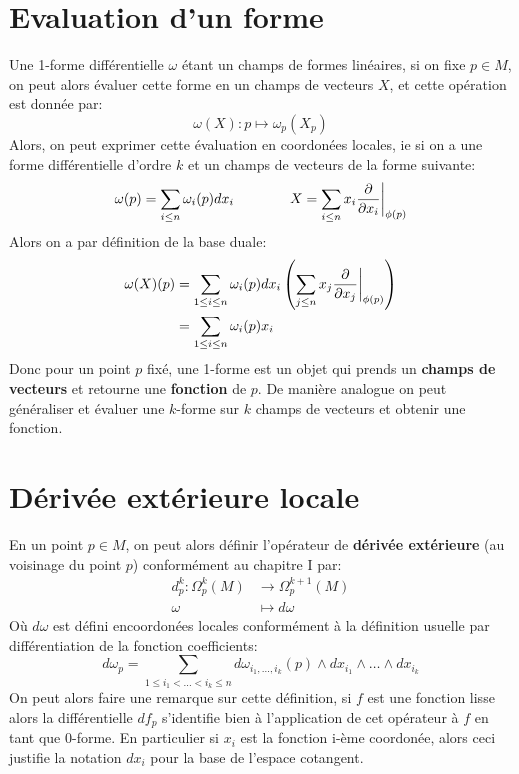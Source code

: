 \section{Evaluation d'un forme}
Une 1-forme différentielle \( \omega \) étant un champs de formes linéaires, si on fixe \( p \in M \), on peut alors évaluer cette forme en un champs de vecteurs \( X \), et cette opération est donnée par:
\[ 
   \omega(X) : p \longmapsto \omega_p(X_p)
\]
Alors, on peut exprimer cette évaluation en coordonées locales, ie si on a une forme différentielle d'ordre \( k \) et un champs de vecteurs de la forme suivante:
\[
   \omega(p) = \sum_{i \leq n} \omega_{i}(p) dx_{i} \quad\quad\quad\quad X = \sum_{i \leq n} x_i \frac{\partial }{\partial x_i}\biggr|_{\phi(p)}
\]
Alors on a par définition de la base duale:
\begin{align*}
   \omega(X)(p) &=  \sum_{1 \leq i \leq n} \omega_{i}(p) dx_{i}\left(\sum_{j \leq n} x_j \frac{\partial }{\partial x_j}\biggr|_{\phi(p)} \right)\\
   &=  \sum_{1 \leq i \leq n} \omega_{i}(p)x_i
\end{align*} 
Donc pour un point \( p \) fixé, une 1-forme est un objet qui prends un \textbf{champs de vecteurs} et retourne une \textbf{fonction} de \( p \). De manière analogue on peut généraliser et évaluer une \( k \)-forme sur \( k \) champs de vecteurs et obtenir une fonction.
\section{Dérivée extérieure locale}
En un point \( p \in M \), on peut alors définir l'opérateur de \textbf{dérivée extérieure} (au voisinage du point \( p \)) conformément au chapitre I par:
\[ 
   \begin{aligned}
      d_p^k : \Omega^k_p(M) &\longrightarrow \Omega^{k+1}_p(M) \\
      \omega &\longmapsto d \omega
   \end{aligned} 
\]
Où \( d \omega \) est défini encoordonées locales conformément à la définition usuelle par différentiation de la fonction coefficients:
\[ 
   d \omega_p = \sum_{1 \leq i_1 < \ldots < i_k \leq n} d\omega_{i_1, \ldots, i_k}(p) \wedge dx_{i_1} \wedge \ldots \wedge dx_{i_k}
\]
On peut alors faire une remarque sur cette définition, si \( f \) est une fonction lisse alors la différentielle \( df_p \) s'identifie bien à l'application de cet opérateur à \( f \) en tant que \( 0 \)-forme. En particulier si \( x_i \) est la fonction i-ème coordonée, alors ceci justifie la notation \( dx_i \) pour la base de l'espace cotangent.
